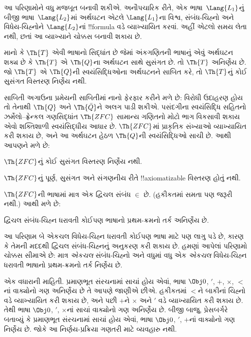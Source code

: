 \documentclass[../../../include/open-logic-section]{subfiles}
\begin{document}


આ પરિણામોને વધુ મજબૂત
બનાવી શકીએ. અનૌપચારિક રીતે,
એક ભાષા~$\Lang{L_1}$નું
બીજી ભાષા~$\Lang{L_2}$માં
અર્થઘટન એટલે
$\Lang{L_1}$ના વિશ્વ,
સંબંધ-ચિહ્નો અને
વિધેય-ચિહ્નોને
$\Lang{L_2}$નાં
!!{formula} વડે વ્યાખ્યાયિત
કરવાં. અહીં એટલો સમય
લેતા નથી, છતાં આ
વ્યાખ્યાને ચોક્કસ બનાવી
શકાય છે.

\begin{thm}
  માનો કે $\Th{T}$ એવી
  ભાષાનો સિદ્ધાંત છે જેમાં
  અંકગણિતની ભાષાનું એવું
  અર્થઘટન શક્ય છે કે
  $\Th{T}$ એ $\Th{Q}$ના
  અર્થઘટન સાથે સુસંગત છે.
  તો $\Th{T}$ અનિર્ણેય છે.
  જો $\Th{T}$ એ
  $\Th{Q}$ની સ્વયંસિદ્ધિઓના
  અર્થઘટનને સાબિત કરે,
  તો $\Th{T}$નું કોઈ
  સુસંગત વિસ્તરણ નિર્ણેય
  નથી.
\end{thm}

સાબિતી અગાઉના પ્રમેયની
સાબિતીમાં નાનો ફેરફાર
કરીને મળે છે: વિરોધી
ઉદાહરણ હોય તો તેનાથી
$\Th{Q}$ અને
$\Th{\bar Q}$ને અલગ
પાડી શકીએ. પસંદગીના
સ્વયંસિદ્ધિ સહિતનો
ઝર્મેલો--ફ્રેન્કલ ગણસિદ્ધાંત
$\Th{ZFC}$ સામાન્ય ગણિતનો
મોટો ભાગ વિકસાવી શકાય
એવો શક્તિશાળી
સ્વયંસિદ્ધીય આધાર છે.
$\Th{ZFC}$માં પ્રાકૃતિક
સંખ્યાઓ વ્યાખ્યાયિત કરી
શકાય છે, અને આ અર્થઘટન
હેઠળ $\Th{Q}$ની
સ્વયંસિદ્ધિઓ સાચી છે.
આથી આપણને મળે છે:

\begin{cor}
$\Th{ZFC}$નું કોઈ
સુસંગત વિસ્તરણ નિર્ણેય નથી.
\end{cor}

\begin{cor}
$\Th{ZFC}$નું પૂર્ણ,
સુસંગત અને સંગણનીય
રીતે !!{axiomatizable}
વિસ્તરણ હોતું નથી.
\end{cor}

$\Th{ZFC}$ની ભાષામાં
માત્ર એક દ્વિચલ સંબંધ
$\in$ છે. (હકીકતમાં
સમતા પણ જરૂરી નથી.)
આથી મળે છે:

\begin{cor}
દ્વિચલ સંબંધ-ચિહ્ન
ધરાવતી કોઈપણ ભાષાનો
પ્રથમ-ક્રમનો તર્ક
અનિર્ણેય છે.
\end{cor}

આ પરિણામ બે એકચલ
વિધેય-ચિહ્ન ધરાવતી કોઈપણ
ભાષા માટે પણ લાગુ પડે છે,
કારણ કે તેમની મદદથી
દ્વિચલ સંબંધ-ચિહ્નનું
અનુકરણ કરી શકાય છે.
હમણાં આપેલાં પરિણામો
ચોક્કસ સીમાએ છે: માત્ર
\emph{એકચલ} સંબંધ-ચિહ્નો
અને વધુમાં વધુ એક
\emph{એકચલ} વિધેય-ચિહ્ન
ધરાવતી ભાષાનો પ્રથમ-ક્રમનો
તર્ક નિર્ણેય છે.

એક વધારાની માહિતી.
પ્રમાણભૂત સંરચનામાં સાચાં
હોય એવાં, ભાષા
$\Obj 0$, $'$, $+$,
$\times$, $<$નાં વાક્યોનો
ગણ અનિર્ણેય છે તે આપણે
જાણીએ છીએ. હકીકતમાં
$<$ને બાકીનાં ચિહ્નો
વડે વ્યાખ્યાયિત કરી
શકાય છે, અને પછી
$+$ને $\times$ અને $'$
વડે વ્યાખ્યાયિત કરી
શકાય છે. તેથી ભાષા
$\Obj 0$, $'$, $\times$નાં
સાચાં વાક્યોનો ગણ
અનિર્ણેય છે. બીજી બાજુ,
પ્રેસબર્ગરે બતાવ્યું કે
પ્રમાણભૂત સંરચનામાં
સાચાં હોય એવાં, ભાષા
$\Obj 0$, $'$, $+$નાં
વાક્યોનો ગણ નિર્ણેય છે.
જોકે આ નિર્ણય-પ્રક્રિયા
ગણતરી માટે વ્યવહારુ નથી.
\end{document}
